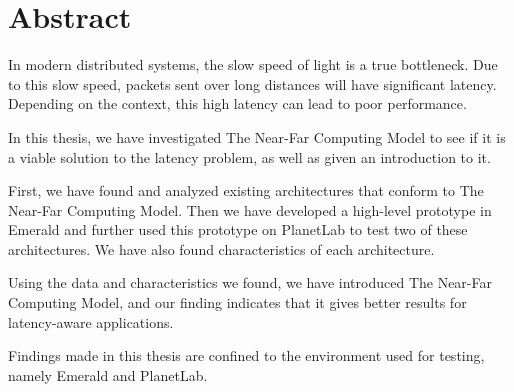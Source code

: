\chapter*{Abstract}
In modern distributed systems, the slow speed of light is a true bottleneck. Due to this slow speed, packets sent over long distances will have significant latency. Depending on the context, this high latency can lead to poor performance.


In this thesis, we have investigated The Near-Far Computing Model to see if it is a viable solution to the latency problem, as well as given an introduction to it. 

First, we have found and analyzed existing architectures that conform to The Near-Far Computing Model. Then we have developed a high-level prototype in Emerald and further used this prototype on PlanetLab to test two of these architectures. We have also found characteristics of each architecture. 

Using the data and characteristics we found, we have introduced The Near-Far Computing Model, and our finding indicates that it gives better results for latency-aware applications.

Findings made in this thesis are confined to the environment used for testing, namely Emerald and PlanetLab.
